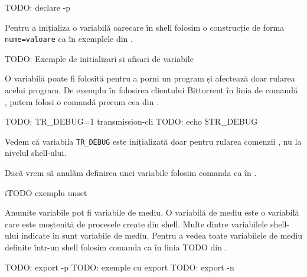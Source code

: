 \begin{screen}[caption={Afișarea variabilelor definite în shell},label={lst:cli:print-vars}]
TODO: declare -p
\end{screen}

Pentru a inițializa o variabilă oarecare în shell folosim o construcție de forma
\texttt{nume=valoare} ca în exemplele din .

\begin{screen}[caption={Inițializarea variabilelor în shell},label={lst:cli:init-var}]
TODO: Exemple de initializari si afisari de variabile
\end{screen}

O variabilă poate fi folosită pentru a porni un program și afectează doar
rularea acelui program. De exemplu în folosirea clientului Bittorrent în linia
de comandă , putem folosi o comandă precum cea din .

\begin{screen}[caption={Folosirea unei variabile pentru a afecta funcțîonarea unui program},label={lst:cli:transmission-cli}]
TODO: TR_DEBUG=1 transmission-cli
TODO: echo \$TR_DEBUG
\end{screen}

Vedem că variabila \texttt{TR_DEBUG} este inițializată doar pentru rularea comenzii
, nu la nivelul shell-ului.

Dacă vrem să anulăm definirea unei variabile folosim comanda  ca în .

\begin{screen}[caption={Anularea definirii unei variabile},label={lst:cli:unset}]
iTODO exemplu unset
\end{screen}

Anumite variabile pot fi variabile de mediu. O variabilă de mediu este o
variabilă care este moștenită de procesele create din shell. Multe dintre
variabilele shell-ului indicate în  sunt variabile de mediu. Pentru
a vedea toate variabilele de mediu definite într-un shell folosim comanda  ca în linia TODO din .

\begin{screen}[caption={Gestiunea variabilelor de mediu (export)},label={lst:cli:export}]
TODO: export -p
TODO: exemple cu export
TODO: export -n
\end{screen}


